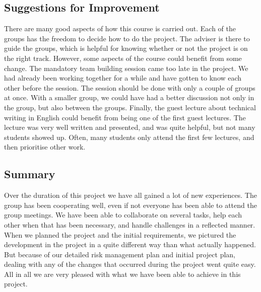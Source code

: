 \documentclass[../document]{subfiles}
\begin{document}
\subsection{Suggestions for Improvement}
There are many good aspects of how this course is carried out. Each of the groups has the freedom to decide how to do the project. The adviser is there to guide the groups, which is helpful for knowing whether or not the project is on the right track. However, some aspects of the course could benefit from some change. The mandatory team building session came too late in the project. We had already been working together for a while and have gotten to know each other before the session. The session should be done with only a couple of groups at once. With a smaller group, we could have had a better discussion not only in the group, but also between the groups. Finally, the guest lecture about technical writing in English could benefit from being one of the first guest lectures. The lecture was very well written and presented, and was quite helpful, but not many students showed up. Often, many students only attend the first few lectures, and then prioritise other work.

\subsection{Summary}
Over the duration of this project we have all gained a lot of new experiences. The group has been cooperating well, even if not everyone has been able to attend the group meetings. We have been able to collaborate on several tasks, help each other when that has been necessary, and handle challenges in a reflected manner. When we planned the project and the initial requirements, we pictured the development in the project in a quite different way than what actually happened. But because of our detailed risk management plan and initial project plan, dealing with any of the changes that occurred during the project went quite easy. All in all we are very pleased with what we have been able to achieve in this project.
\end{document}
